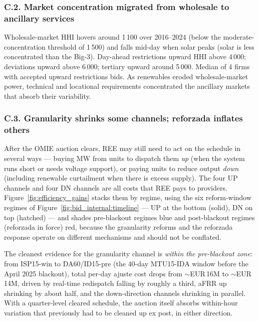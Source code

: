 \documentclass[11pt]{article}
\begin{document}
\subsubsection*{C.2. Market concentration migrated from wholesale to ancillary services}
Wholesale-market HHI hovers around 1\,100 over 2016--2024 (below the moderate-concentration threshold of 1\,500) and falls mid-day when solar peaks (solar is less concentrated than the Big-3). Day-ahead restrictions upward HHI above 4\,000; deviations upward above 6\,000; tertiary upward around 5\,000. Median of 4 firms with accepted upward restrictions bids. As renewables eroded wholesale-market power, technical and locational requirements concentrated the ancillary markets that absorb their variability.

\subsubsection*{C.3. Granularity shrinks some channels; reforzada inflates others}
After the OMIE auction clears, REE may still need to act on the schedule in several ways --- buying MW from units to dispatch them \emph{up} (when the system runs short or needs voltage support), or paying units to reduce output \emph{down} (including renewable curtailment when there is excess supply). The four UP channels and four DN channels are all costs that REE pays to providers. Figure~\ref{fig:efficiency_gains} stacks them by regime, using the six reform-window regimes of Figure~\ref{fig:bid_internal:timeline} --- UP at the bottom (solid), DN on top (hatched) --- and shades pre-blackout regimes blue and post-blackout regimes (reforzada in force) red, because the granularity reforms and the reforzada response operate on different mechanisms and should not be conflated.

The cleanest evidence for the granularity channel is \emph{within the pre-blackout zone}: from ISP15-win to DA60/ID15-pre (the 40-day MTU15-IDA window before the April 2025 blackout), total per-day ajuste cost drops from $\sim$EUR\,16M to $\sim$EUR\,14M, driven by real-time redispatch falling by roughly a third, aFRR up shrinking by about half, and the down-direction channels shrinking in parallel. With a quarter-level cleared schedule, the auction itself absorbs within-hour variation that previously had to be cleaned up ex post, in either direction.
\end{document}
